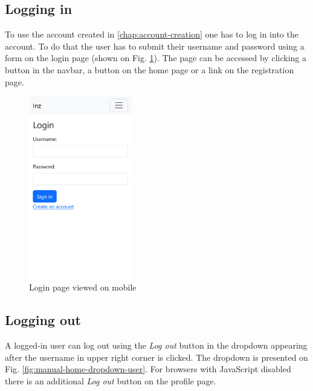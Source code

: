 \subsection{Logging in}

To use the account created in \ref{chap:account-creation} one has to log in into the account. To do that the user has to submit their username and password using a form on the login page (shown on Fig. \ref{fig:manual-login}). The page can be accessed by clicking a button in the navbar, a button on the home page or a link on the registration page.

\begin{figure}
    \centering
    \includegraphics[width=0.4\textwidth]{img/manual-login.png}
    \caption{Login page viewed on mobile}
    \label{fig:manual-login}
\end{figure}

\subsection{Logging out}

A logged-in user can log out using the \textit{Log out} button in the dropdown appearing after the username in upper right corner is clicked. The dropdown is presented on Fig. \ref{fig:manual-home-dropdown-user}. For browsers with JavaScript disabled there is an additional \textit{Log out} button on the profile page.

